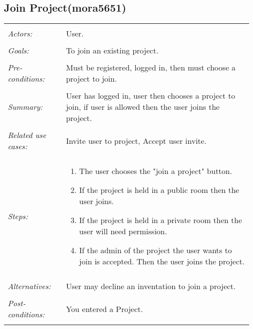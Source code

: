 \subsection{Join Project(mora5651)}
\begin{tabular}{ p{2cm} p{12cm} }
\hline
\\
\textit{Actors:} & User.\\
\\
\textit{Goals:} & To join an existing project.\\
\\
\textit{Pre-conditions:} & Must be registered, logged in, then must choose a project to join.\\
\\
\textit{Summary:} & User has logged in, user then chooses a project to join, if user is allowed then the user joins the project. \\
\\
\textit{Related use cases:} & Invite user to project, Accept user invite. \\
\\
\textit{Steps:} & \begin{enumerate}
 \item The user chooses the "join a project" button. 
 \item If the project is held in a public room then the user joins. 
 \item If the project is held in a private room then the user will need permission. 
 \item If the admin of the project the user wants to join is accepted. Then the user joins the project. 
\end{enumerate}\\
\\
\textit{Alternatives:} & User may decline an inventation to join a project. \\
\\
\textit{Post-conditions:} & You entered a Project. \\
\\
\hline
\end{tabular}

